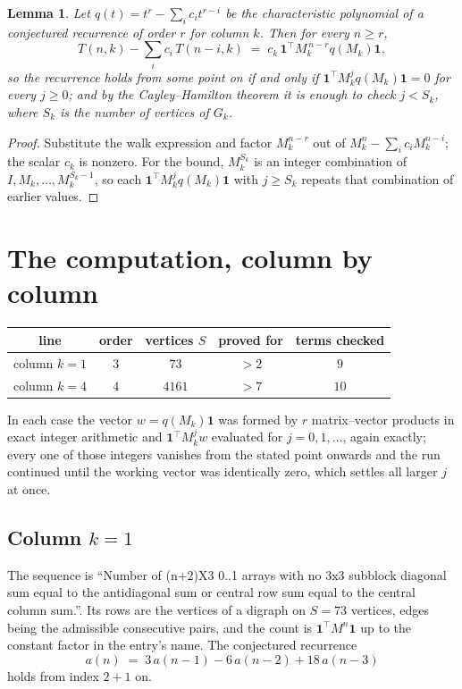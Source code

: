 \documentclass[11pt,a4paper]{article}
\theoremstyle{plain}
\newtheorem{lemma}[theorem]{Lemma}
\theoremstyle{definition}
\begin{document}
\begin{lemma}\label{lem:crit}
Let $q(t)=t^{r}-\sum_i c_it^{r-i}$ be the characteristic polynomial of a conjectured
recurrence of order $r$ for column $k$. Then for every $n\ge r$,
\[
T(n,k)-\sum_i c_i\,T(n-i,k)\;=\;c_k\,\mathbf{1}^{\!\top}M_k^{\,n-r}q(M_k)\mathbf{1},
\]
so the recurrence holds from some point on if and only if
$\mathbf{1}^{\!\top}M_k^{j}q(M_k)\mathbf{1}=0$ for every $j\ge0$; and by the
Cayley--Hamilton theorem it is enough to check $j<S_k$, where $S_k$ is the number of vertices
of $G_k$.
\end{lemma}

\begin{proof}
Substitute the walk expression and factor $M_k^{n-r}$ out of $M_k^{n}-\sum_ic_iM_k^{n-i}$;
the scalar $c_k$ is nonzero. For the bound, $M_k^{S_k}$ is an integer combination of
$I,M_k,\dots,M_k^{S_k-1}$, so each $\mathbf{1}^{\!\top}M_k^{j}q(M_k)\mathbf{1}$ with
$j\ge S_k$ repeats that combination of earlier values.
\end{proof}

\section{The computation, column by column}

\begin{center}
\begin{tabular}{ccccc}
line & order & vertices $S$ & proved for & terms checked \\ \hline
column $k$$=1$ & $3$ & $73$ & $>2$ & $9$ \\
column $k$$=4$ & $4$ & $4161$ & $>7$ & $10$ \\
\end{tabular}
\end{center}

In each case the vector $w=q(M_k)\mathbf{1}$ was formed by $r$ matrix--vector products in
exact integer arithmetic and $\mathbf{1}^{\!\top}M_k^{j}w$ evaluated for $j=0,1,\dots$,
again exactly; every one of those integers vanishes from the stated point onwards and the run
continued until the working vector was identically zero, which settles all larger $j$ at once.

\subsection*{Column $k$$=1$}
The sequence is ``Number of (n+2)X3 0..1 arrays with no 3x3 subblock diagonal sum equal to the antidiagonal sum or central row sum equal to the central column sum.''. Its rows are the vertices of a digraph on
$S=73$ vertices, edges being the admissible consecutive pairs, and the count is
$\mathbf{1}^{\!\top}M^{n}\mathbf{1}$ up to the constant factor in the entry's name.
The conjectured recurrence
\[
a(n)\;=\;3\,a(n-1) - 6\,a(n-2) + 18\,a(n-3)
\]
holds from index $2+1$ on.
\end{document}
